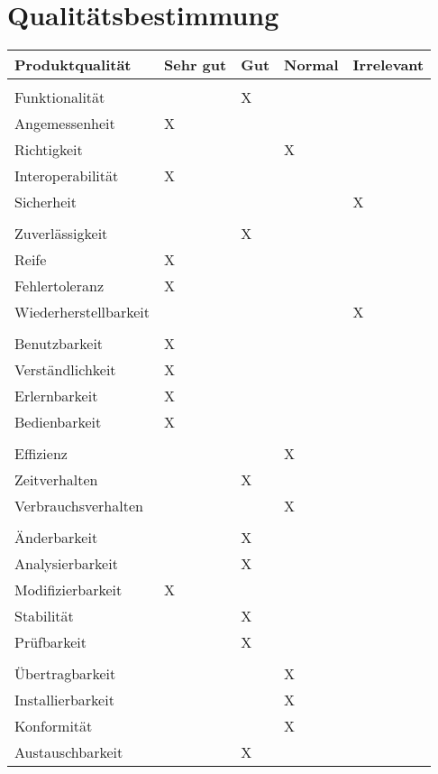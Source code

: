 \documentclass[pflichtenheft.tex]{subfiles}
\begin{document}
\chapter{Qualitätsbestimmung}

\begin{table}[H]
\begin{tabular}{ | l | p{2.5cm} | p{2.5cm} | p{2.5cm} | p{2.5cm} | }
    \hline
    \textbf{Produktqualität} & \textbf{Sehr gut} & \textbf{Gut} & \textbf{Normal} & 
    	\textbf{Irrelevant}\\ \hline
    &&&& \\
    \Large{Funktionalität}	&  & X &  &  \\    \hline
    Angemessenheit 			& X &  &  &  \\    \hline
    Richtigkeit    			&  &  & X &  \\    \hline
    Interoperabilität   	& X &  &  &  \\    \hline
    Sicherheit				&  &  &  & X \\    \hline
    &&&& \\
    \Large{Zuverlässigkeit} &  & X &  &  \\    \hline
    Reife					& X &  &  &  \\    \hline
    Fehlertoleranz			& X &  &  &  \\    \hline
    Wiederherstellbarkeit	&  &  &  & X \\    \hline
    &&&& \\
    \Large{Benutzbarkeit}	& X &  &  &  \\    \hline
    Verständlichkeit		& X &  &  &  \\    \hline
    Erlernbarkeit			& X &  &  &  \\    \hline
    Bedienbarkeit			& X &  &  &  \\    \hline
    &&&& \\
    \Large{Effizienz}		&  &  & X &  \\    \hline
    Zeitverhalten			&  & X &  &  \\    \hline
    Verbrauchsverhalten		&  &  & X &  \\    \hline
    &&&& \\
    \Large{Änderbarkeit}	&  & X &  &  \\    \hline
    Analysierbarkeit		&  & X &  &  \\    \hline
    Modifizierbarkeit		& X &  &  &  \\    \hline
    Stabilität				&  & X &  &  \\    \hline
    Prüfbarkeit				&  & X &  &  \\    \hline
    &&&& \\
    \Large{Übertragbarkeit}	&  &  & X &  \\    \hline
    Installierbarkeit		&  &  & X &  \\    \hline
    Konformität				&  &  & X &  \\    \hline
    Austauschbarkeit		&  & X &  &  \\    \hline
    
    
\end{tabular}
\end{table}
\end{document}

